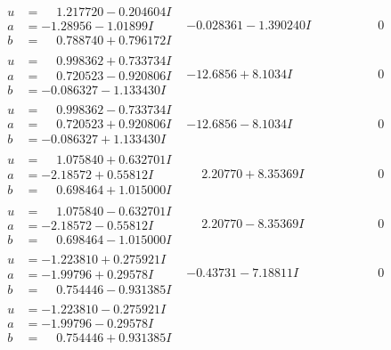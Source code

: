 \documentclass[1p]{elsarticle_modified}
\theoremstyle{definition}
\begin{document}
$$\begin{array}{c|c|c}
\begin{aligned}
u &= \phantom{-}1.217720 - 0.204604 I \\
a &= -1.28956 - 1.01899 I \\
b &= \phantom{-}0.788740 + 0.796172 I\end{aligned}
 & -0.028361 - 1.390240 I & \phantom{-0.000000 } 0 \\ \hline\begin{aligned}
u &= \phantom{-}0.998362 + 0.733734 I \\
a &= \phantom{-}0.720523 - 0.920806 I \\
b &= -0.086327 - 1.133430 I\end{aligned}
 & -12.6856 + 8.1034 I & \phantom{-0.000000 } 0 \\ \hline\begin{aligned}
u &= \phantom{-}0.998362 - 0.733734 I \\
a &= \phantom{-}0.720523 + 0.920806 I \\
b &= -0.086327 + 1.133430 I\end{aligned}
 & -12.6856 - 8.1034 I & \phantom{-0.000000 } 0 \\ \hline\begin{aligned}
u &= \phantom{-}1.075840 + 0.632701 I \\
a &= -2.18572 + 0.55812 I \\
b &= \phantom{-}0.698464 + 1.015000 I\end{aligned}
 & \phantom{-}2.20770 + 8.35369 I & \phantom{-0.000000 } 0 \\ \hline\begin{aligned}
u &= \phantom{-}1.075840 - 0.632701 I \\
a &= -2.18572 - 0.55812 I \\
b &= \phantom{-}0.698464 - 1.015000 I\end{aligned}
 & \phantom{-}2.20770 - 8.35369 I & \phantom{-0.000000 } 0 \\ \hline\begin{aligned}
u &= -1.223810 + 0.275921 I \\
a &= -1.99796 + 0.29578 I \\
b &= \phantom{-}0.754446 - 0.931385 I\end{aligned}
 & -0.43731 - 7.18811 I & \phantom{-0.000000 } 0 \\ \hline\begin{aligned}
u &= -1.223810 - 0.275921 I \\
a &= -1.99796 - 0.29578 I \\
b &= \phantom{-}0.754446 + 0.931385 I\end{aligned}

\end{array}$$
\end{document}
